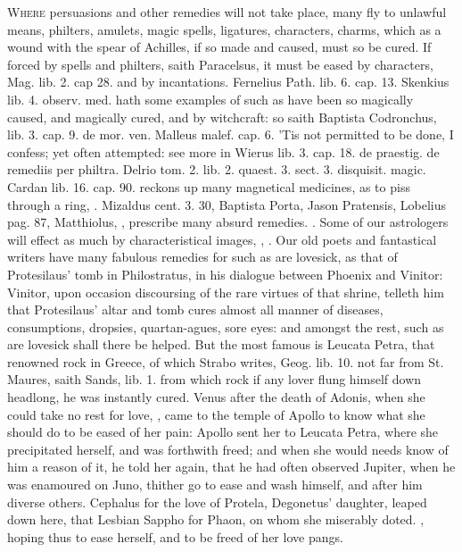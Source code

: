 \lettrine{W}{here} persuasions and other remedies will not take place, many fly to
unlawful means, philters, amulets, magic spells, ligatures, characters,
charms, which as a wound with the spear of Achilles, if so made and
caused, must so be cured. If forced by spells and philters, saith
Paracelsus, it must be eased by characters, Mag. lib. 2. cap 28. and by
incantations. Fernelius Path. lib. 6. cap. 13. Skenkius lib. 4.
observ. med. hath some examples of such as have been so magically
caused, and magically cured, and by witchcraft: so saith Baptista
Codronchus, lib. 3. cap. 9. de mor. ven. Malleus malef. cap. 6. 'Tis
not permitted to be done, I confess; yet often attempted: see more in
Wierus lib. 3. cap. 18. de praestig. de remediis per philtra. Delrio
tom. 2. lib. 2. quaest. 3. sect. 3. disquisit. magic. Cardan lib. 16.
cap. 90. reckons up many magnetical medicines, as to piss through a
ring, \etc{}. Mizaldus cent. 3. 30, Baptista Porta, Jason Pratensis,
Lobelius pag. 87, Matthiolus, \etc{}, prescribe many absurd remedies.
. Some of our astrologers will
effect as much by characteristical images, , \etc{}. Our
old poets and fantastical writers have many fabulous remedies for such
as are lovesick, as that of Protesilaus' tomb in Philostratus, in his
dialogue between Phoenix and Vinitor: Vinitor, upon occasion
discoursing of the rare virtues of that shrine, telleth him that
Protesilaus' altar and tomb cures almost all manner of diseases,
consumptions, dropsies, quartan-agues, sore eyes: and amongst the rest,
such as are lovesick shall there be helped. But the most famous is
Leucata Petra, that renowned rock in Greece, of which Strabo
writes, Geog. lib. 10. not far from St. Maures, saith Sands, lib. 1.
from which rock if any lover flung himself down headlong, he was
instantly cured. Venus after the death of Adonis, when she could take
no rest for love, , came
to the temple of Apollo to know what she should do to be eased of her
pain: Apollo sent her to Leucata Petra, where she precipitated herself,
and was forthwith freed; and when she would needs know of him a reason
of it, he told her again, that he had often observed Jupiter,
when he was enamoured on Juno, thither go to ease and wash himself, and
after him diverse others. Cephalus for the love of Protela, Degonetus'
daughter, leaped down here, that Lesbian Sappho for Phaon, on whom she
miserably doted. , hoping thus to ease
herself, and to be freed of her love pangs.

